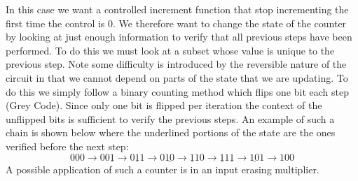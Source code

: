   In this case we want a controlled increment function that stop incrementing the first time the control is $0$.
  We therefore want to change the state of the counter by looking at just enough information to verify that all previous steps have been performed.
  To do this we must look at a subset whose value is unique to the previous step.
  Note some difficulty is introduced by the reversible nature of the circuit in that we cannot depend on parts of the state that we are updating.
  To do this we simply follow a binary counting method which flips one bit each step (Grey Code).
  Since only one bit is flipped per iteration the context of the unflipped bits is sufficient to verify the previous steps.
  An example of such a chain is shown below where the underlined portions of the state are the ones verified before the next step:
  \[
    000 \to 00\underline{1} \to 0\underline{1}1 \to 0\underline{10} \to \underline{1}10 \to
    \underline{1}1\underline{1} \to \underline{10}1 \to 100
  \]
  A possible application of such a counter is in an input erasing multiplier.
